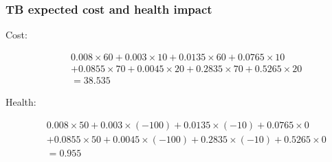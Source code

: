 \begin{frame}
\frametitle{TB expected cost and health impact}

Cost:

\begin{eqnarray*}
&& 0.008 \times 60 + 0.003 \times 10 + 0.0135 \times 60 + 0.0765 \times 10\\
&& + 0.0855 \times 70 + 0.0045 \times 20 + 0.2835 \times 70 + 0.5265 \times 20\\
&& = 38.535
\end{eqnarray*}

Health:

\begin{eqnarray*}
&& 0.008 \times 50 + 0.003 \times (-100) + 0.0135 \times (-10) + 0.0765 \times 0\\
&&  + 0.0855 \times 50 + 0.0045 \times (-100) + 0.2835 \times (-10) + 0.5265 \times 0\\
&& = 0.955
\end{eqnarray*}

\end{frame}



